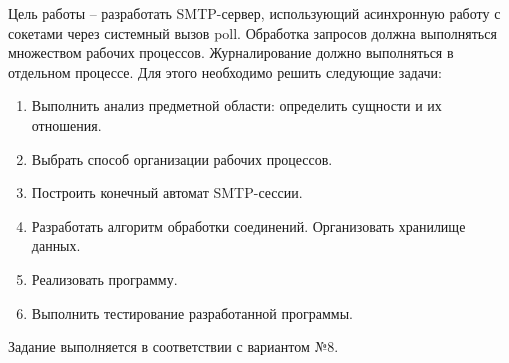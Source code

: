 \Introduction

Цель работы -- разработать SMTP-сервер, использующий асинхронную работу с сокетами через системный вызов poll.
Обработка запросов должна выполняться множеством рабочих процессов.
Журналирование должно выполняться в отдельном процессе.
Для этого необходимо решить следующие задачи:
\begin{enumerate}
\item Выполнить анализ предметной области: определить сущности и их отношения.
\item Выбрать способ организации рабочих процессов.
\item Построить конечный автомат SMTP-сессии.
\item Разработать алгоритм обработки соединений. Организовать хранилище данных.
\item Реализовать программу.
\item Выполнить тестирование разработанной программы.
\end{enumerate}

Задание выполняется в соответствии с вариантом №8.

